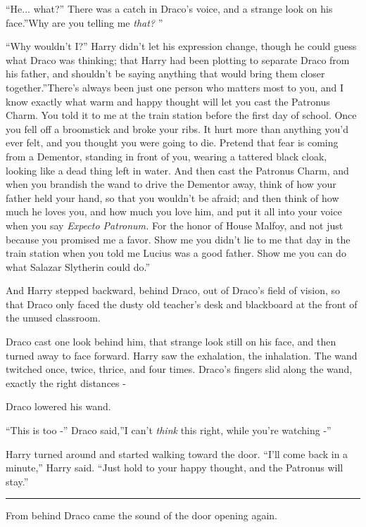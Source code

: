 ``He... what?'' There was a catch in Draco's voice, and a strange
look on his face.''Why are you telling me \emph{that?} ''

``Why wouldn't I?'' Harry didn't let his expression change, though he
could guess what Draco was thinking; that Harry had been plotting to
separate Draco from his father, and shouldn't be saying anything that
would bring them closer together.''There's always been just one person
who matters most to you, and I know exactly what warm and happy thought
will let you cast the Patronus Charm. You told it to me at the train
station before the first day of school. Once you fell off a broomstick
and broke your ribs. It hurt more than anything you'd ever felt, and you
thought you were going to die. Pretend that fear is coming from a
Dementor, standing in front of you, wearing a tattered black cloak,
looking like a dead thing left in water. And then cast the Patronus
Charm, and when you brandish the wand to drive the Dementor away, think
of how your father held your hand, so that you wouldn't be afraid; and
then think of how much he loves you, and how much you love him, and put
it all into your voice when you say \emph{Expecto Patronum.} For the
honor of House Malfoy, and not just because you promised me a favor.
Show me you didn't lie to me that day in the train station when you told
me Lucius was a good father. Show me you can do what Salazar Slytherin
could do.''

And Harry stepped backward, behind Draco, out of Draco's field of
vision, so that Draco only faced the dusty old teacher's desk and
blackboard at the front of the unused classroom.

Draco cast one look behind him, that strange look still on his face, and
then turned away to face forward. Harry saw the exhalation, the
inhalation. The wand twitched once, twice, thrice, and four times.
Draco's fingers slid along the wand, exactly the right distances -

Draco lowered his wand.

``This is too -'' Draco said,''I can't \emph{think} this right, while
you're watching -''

Harry turned around and started walking toward the door. ``I'll come
back in a minute,'' Harry said. ``Just hold to your happy thought, and
the Patronus will stay.''

\begin{center}\rule{3in}{0.4pt}\end{center}

From behind Draco came the sound of the door opening again.

